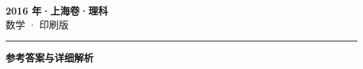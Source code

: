 \documentclass[zihao=5, a4paper]{ctexart}
\begin{document}
\begin{center}
  {\Large\bfseries 2016 年·上海卷·理科}\\[4pt]
  {\large 数学 · 印刷版}
\end{center}
\medskip
{}

\par\bigskip\hrule\bigskip
{}
\begin{center}{\large\bfseries 参考答案与详细解析}\end{center}
\smallskip

\end{document}
